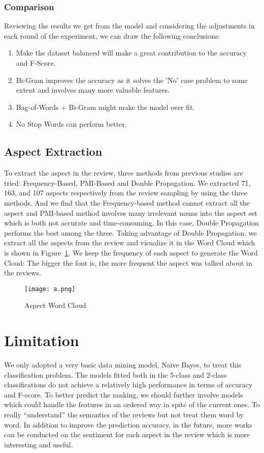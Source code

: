 \documentclass[12pt]{article}
\begin{document}
\subsubsection{Comparison}
Reviewing the results we get from the model and considering the adjustments in each round of the experiment, we can draw the following conclusions:
\begin{enumerate}
\item Make the dataset balanced will make a great contribution to the accuracy and F-Score.
\item Bi-Gram improves the accuracy as it solves the 'No' case problem to some extent and involves many more valuable features.
\item Bag-of-Words + Bi-Gram might make the model over fit.
\item No Stop Words can perform better.
\end{enumerate}

\subsection{Aspect Extraction}
To extract the aspect in the review, three methods from previous studies are tried: Frequency-Based, PMI-Based and Double Propagation. We extracted 71, 163, and 107 aspects respectively from the review sampling by using the three methods. And we find that the Frequency-based method cannot extract all the aspect and PMI-based method involves many irrelevant nouns into the aspect set which is both not accurate and time-consuming. In this case, Double Propagation performs the best among the three. Taking advantage of Double Propagation, we extract all the aspects from the review and visualize it in the Word Cloud which is shown in Figure~\ref{wordcloud}. We keep the frequency of each aspect to generate the Word Cloud: The bigger the font is, the more frequent the aspect was talked about in the reviews. 

\begin{figure}[!tp]
\centering
\texttt{[image: a.png]}
\caption{Aspect Word Cloud}
\label{wordcloud}
\end{figure}

\section{Limitation}
We only adopted a very basic data mining model, Naive Bayes, to treat this classification problem. The models fitted both in the 5-class and 2-class classifications do not achieve a relatively high performance in terms of accuracy and F-score. To better predict the ranking, we should further involve models which could handle the features in an ordered way in spite of the current ones. To really ``understand'' the semantics of the reviews but not treat them word by word. In addition to improve the prediction accuracy, in the future, more works can be conducted on the sentiment for each aspect in the review which is more interesting and useful.
\end{document}

